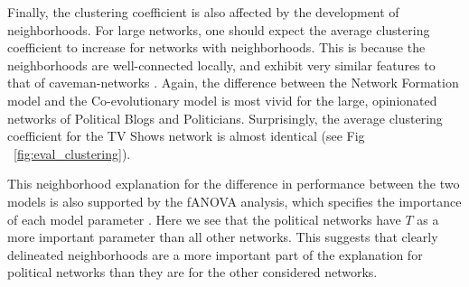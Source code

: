 \documentclass{article}
\begin{document}
Finally, the clustering coefficient is also affected by the development of neighborhoods. For large networks, one should expect the average clustering coefficient to increase for networks with neighborhoods. This is because the neighborhoods are well-connected locally, and exhibit very similar features to that of caveman-networks \cite{watts_networks_1999}. Again, the difference between the Network Formation model and the Co-evolutionary model is most vivid for the large, opinionated networks of Political Blogs and Politicians. Surprisingly, the average clustering coefficient for the TV Shows network is almost identical (see Fig ~\ref{fig:eval_clustering}).

This neighborhood explanation for the difference in performance between the two models is also supported by the fANOVA analysis, which specifies the importance of each model parameter \cite{hutter2014efficient}. 
Here we see that the political networks have $T$ as a more important parameter than all other networks. This suggests that clearly delineated neighborhoods are a more important part of the explanation for political networks than they are for the other considered networks. 
\end{document}
